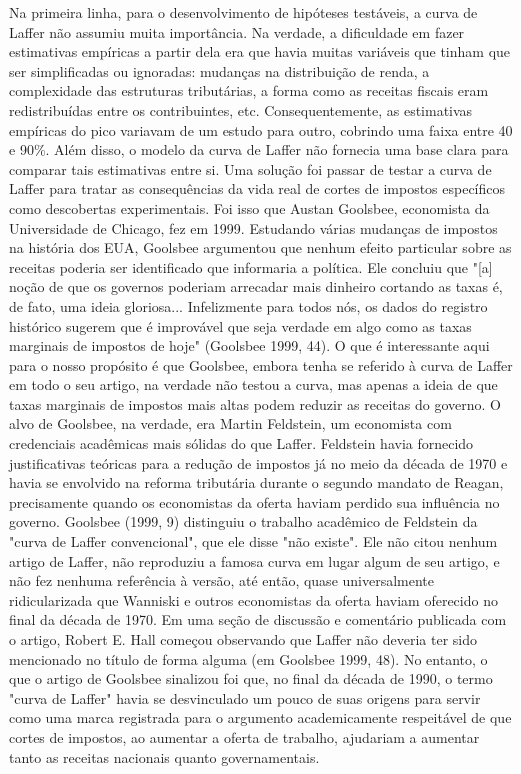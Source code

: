 \documentclass[a4paper,12pt]{article}[abntex2]
\begin{document}
Na primeira linha, para o desenvolvimento de hipóteses testáveis, a curva de Laffer não assumiu muita importância. Na verdade, a dificuldade em fazer estimativas empíricas a partir dela era que havia muitas variáveis que tinham que ser simplificadas ou ignoradas: mudanças na distribuição de renda, a complexidade das estruturas tributárias, a forma como as receitas fiscais eram redistribuídas entre os contribuintes, etc. Consequentemente, as estimativas empíricas do pico variavam de um estudo para outro, cobrindo uma faixa entre 40 e 90\%. Além disso, o modelo da curva de Laffer não fornecia uma base clara para comparar tais estimativas entre si. Uma solução foi passar de testar a curva de Laffer para tratar as consequências da vida real de cortes de impostos específicos como descobertas experimentais. Foi isso que Austan Goolsbee, economista da Universidade de Chicago, fez em 1999. Estudando várias mudanças de impostos na história dos EUA, Goolsbee argumentou que nenhum efeito particular sobre as receitas poderia ser identificado que informaria a política. Ele concluiu que "[a] noção de que os governos poderiam arrecadar mais dinheiro cortando as taxas é, de fato, uma ideia gloriosa... Infelizmente para todos nós, os dados do registro histórico sugerem que é improvável que seja verdade em algo como as taxas marginais de impostos de hoje" (Goolsbee 1999, 44). O que é interessante aqui para o nosso propósito é que Goolsbee, embora tenha se referido à curva de Laffer em todo o seu artigo, na verdade não testou a curva, mas apenas a ideia de que taxas marginais de impostos mais altas podem reduzir as receitas do governo. O alvo de Goolsbee, na verdade, era Martin Feldstein, um economista com credenciais acadêmicas mais sólidas do que Laffer. Feldstein havia fornecido justificativas teóricas para a redução de impostos já no meio da década de 1970 e havia se envolvido na reforma tributária durante o segundo mandato de Reagan, precisamente quando os economistas da oferta haviam perdido sua influência no governo. Goolsbee (1999, 9) distinguiu o trabalho acadêmico de Feldstein da "curva de Laffer convencional", que ele disse "não existe". Ele não citou nenhum artigo de Laffer, não reproduziu a famosa curva em lugar algum de seu artigo, e não fez nenhuma referência à versão, até então, quase universalmente ridicularizada que Wanniski e outros economistas da oferta haviam oferecido no final da década de 1970. Em uma seção de discussão e comentário publicada com o artigo, Robert E. Hall começou observando que Laffer não deveria ter sido mencionado no título de forma alguma (em Goolsbee 1999, 48). No entanto, o que o artigo de Goolsbee sinalizou foi que, no final da década de 1990, o termo "curva de Laffer" havia se desvinculado um pouco de suas origens para servir como uma marca registrada para o argumento academicamente respeitável de que cortes de impostos, ao aumentar a oferta de trabalho, ajudariam a aumentar tanto as receitas nacionais quanto governamentais.
\end{document}
